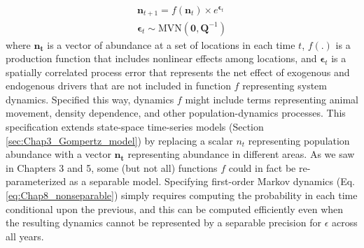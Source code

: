 \begin{equation} \label{eq:Chap8_nonseparable}
\begin{gathered}
    \mathbf{n}_{t+1} = f(\mathbf{n}_{t}) \times e^{\mathbf{\epsilon}_t} \\
    \mathbf{\epsilon}_t \sim \mathrm{MVN}( \mathbf{0, Q}^{-1} )
\end{gathered}
\end{equation}
where \(\mathbf{n_{t}}\) is a vector of abundance at a set of locations in each time \(t\), \(f(.)\) is a production function that includes nonlinear effects among locations, and \(\mathbf{\epsilon}_t\) is a spatially correlated process error that represents the net effect of exogenous and endogenous drivers that are not included in function \(f\) representing system dynamics.  Specified this way, dynamics \(f\) might include terms representing animal movement, density dependence, and other population-dynamics processes.  This specification extends state-space time-series models (Section \ref{sec:Chap3_Gompertz_model}) by replacing a scalar \(n_t\) representing population abundance with a vector \(\mathbf{n_{t}}\) representing abundance in different areas.  As we saw in Chapters 3 and 5, some (but not all) functions \(f\) could in fact be re-parameterized as a separable model.  Specifying first-order Markov dynamics (Eq. \ref{eq:Chap8_nonseparable}) simply requires computing the probability in each time conditional upon the previous, and this can be computed efficiently even when the resulting dynamics cannot be represented by a separable precision for \(\epsilon\) across all years.   

